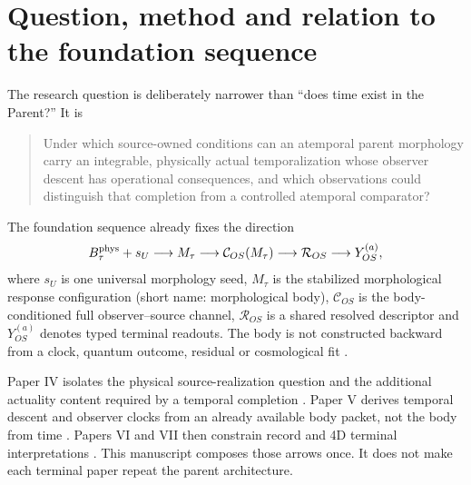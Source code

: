 \documentclass[11pt]{article}
\begin{document}
\begin{center}
\end{center}

\tableofcontents
\clearpage

\section{Question, method and relation to the foundation sequence}

The research question is deliberately narrower than ``does time exist in the
Parent?''  It is
\begin{quote}
Under which source-owned conditions can an atemporal parent morphology carry
an integrable, physically actual temporalization whose observer descent has
operational consequences, and which observations could distinguish that
completion from a controlled atemporal comparator?
\end{quote}

The foundation sequence already fixes the direction
\begin{equation}
 B_\tau^{\rm phys}+s_U
 \longrightarrow M_\tau
 \longrightarrow \mathcal C_{OS}(M_\tau)
 \longrightarrow \mathcal R_{OS}
 \longrightarrow Y_{OS}^{(a)},
 \label{eq:foundation-spine}
\end{equation}
where \(s_U\) is one universal morphology seed, \(M_\tau\) is the stabilized
morphological response configuration (short name: morphological body),
\(\mathcal C_{OS}\) is the body-conditioned full
observer--source channel, \(\mathcal R_{OS}\) is a shared resolved descriptor
and \(Y_{OS}^{(a)}\) denotes typed terminal readouts.  The body is not
constructed backward from a clock, quantum outcome, residual or cosmological
fit \citep{TauFoundationI2026,TauFoundationII2026,TauFoundationIII2026}.

Paper IV isolates the physical source-realization question and the additional
actuality content required by a temporal completion
\citep{TauFoundationIV2026}.  Paper V derives temporal descent and observer
clocks from an already available body packet, not the body from time
\citep{TauFoundationV2026}.  Papers VI and VII then constrain record and 4D
terminal interpretations \citep{TauFoundationVI2026,TauFoundationVII2026}.
This manuscript composes those arrows once.  It does not make each terminal
paper repeat the parent architecture.
\end{document}
